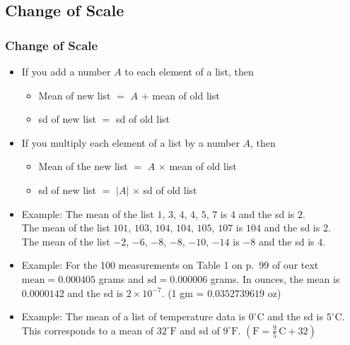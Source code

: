 \documentclass[t]{beamer}
\begin{document}
\subsection{Change of Scale}
\begin{frame}[t]\frametitle{Change of Scale}

{\small
\begin{itemize}
\item If you add a number $A$ to each element of a list, then 
   \begin{itemize}
   \item  Mean of new list $=$ $A$ $+$ mean of old list
   \item  sd of new list $=$ sd of old list
   \end{itemize}
\item If you multiply each element of a list by a number $A$, then
   \begin{itemize}
   \item Mean of the new list $=$ $A$ $\times$ mean of old list
   \item sd of new list $=$ $|A|$ $\times$ sd of old list
   \end{itemize}
\item Example:  The mean of the list {\color{blue}$1$, $3$, $4$, $4$, $5$, $7$} is $4$ and the 
          sd is $2$.\\[-10pt]
\hphantom{Example: } The mean of the list {\color{blue}$101$, $103$, $104$, $104$, $105$, $107$} 
  is  $104$ and the sd is $2$.\\[-10pt]
\hphantom{Example: } The mean of the list {\color{blue}$-2$, $-6$, $-8$, $-8$, $-10$, $-14$}
  is $-8$ and the sd is $4$.
\item Example:  For the 100 measurements on Table 1 on p.~99 of our
  text $\mbox{mean}=0.000405$ grams and  $\mbox{sd}=0.000006$ grams.  In ounces,
  the mean is $0.0000142$ and the sd is $2\times 10^{-7}$.
  (1 gm = $0.0352739619$ oz)
\item Example:  The mean of a list of temperature data is $0^{\circ}\mbox{C}$
and the sd is $5^{\circ}\mbox{C}$. This corresponds to a 
  mean of $32^{\circ}\mbox{F}$ and sd of $9^{\circ}\mbox{F}$. 
$\left(\mbox{F}=\frac{9}{5}\,\mbox{C} + 32\right)$
\end{itemize}
}
\label{lastpage}
\end{frame}
\end{document}
